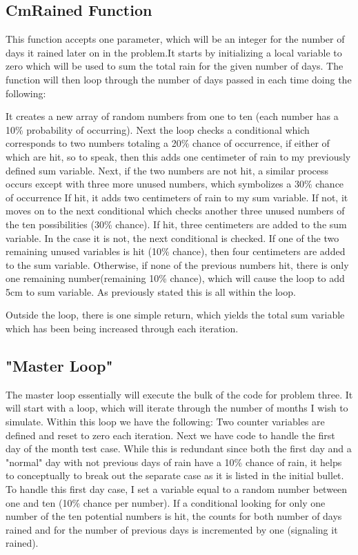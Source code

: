\documentclass[twocolumn]{revtex4}
\begin{document}
\subsection{CmRained Function}
This function accepts one parameter, which will be an integer for the number of days it rained later on in the problem.It starts by initializing a local variable to zero which will be used to sum the total rain for the given number of days. The function will then loop through the number of days passed in each time doing the following:

It creates a new array of random numbers from one to ten (each number has a 10\% probability of occurring). Next the loop checks a conditional which corresponds to two numbers totaling a 20\% chance of occurrence, if either of which are hit, so to speak, then this adds one centimeter of rain to my previously defined sum variable. Next, if the two numbers are not hit, a similar process occurs except with three more unused numbers, which symbolizes a 30\% chance of occurrence If hit, it adds two centimeters of rain to my sum variable. If not, it moves on to the next conditional which checks another three unused numbers of the ten possibilities (30\% chance). If hit, three centimeters are added to the sum variable. In the case it is not, the next conditional is checked. If one of the two remaining unused variables is hit (10\% chance), then four centimeters are added to the sum variable. Otherwise, if none of the previous numbers hit, there is only one remaining number(remaining 10\% chance), which will cause the loop to add 5cm to sum variable. As previously stated this is all within the loop.

Outside the loop, there is one simple return, which yields the total sum variable which has been being increased through each iteration. 

\subsection{"Master Loop"}
The master loop essentially will execute the bulk of the code for problem three. It will start with a loop, which will iterate through the number of months I wish to simulate. Within this loop we have the following:
Two counter variables are defined and reset to zero each iteration. Next we have code to handle the first day of the month test case. While this is redundant since both the first day and a "normal" day with not previous days of rain have a 10\% chance of rain, it helps to conceptually to break out the separate case as it is listed in the initial bullet. To handle this first day case, I set a variable equal to a random number between one and ten (10\% chance per number). If a conditional looking for only one number of the ten potential numbers is hit, the counts for both number of days rained and for the number of previous days is incremented by one (signaling it rained).
\end{document}
